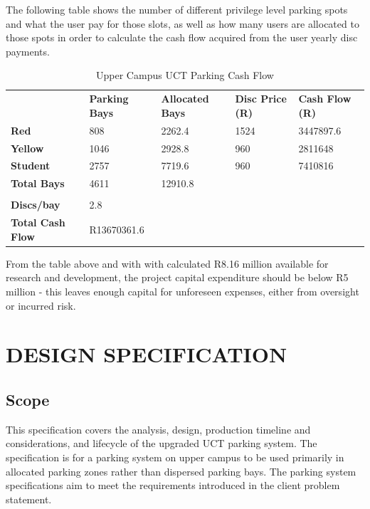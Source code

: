 The following table shows the number of different privilege level parking spots  and what the user pay for those slots, as well as how many users are allocated to those spots in order to calculate the cash flow acquired from the user yearly disc payments.

\begin{table}[H]
\centering
\caption{Upper Campus UCT Parking Cash Flow}
\label{cash-flow}
\begin{tabular}{lllll}
                         & \textbf{Parking Bays} & \textbf{Allocated Bays} & \textbf{Disc Price (R)} & \textbf{Cash Flow (R)} \\
\textbf{Red}                      & 808                   & 2262.4                  & 1524                & 3447897.6          \\
\textbf{Yellow}          & 1046                  & 2928.8                  & 960                 & 2811648            \\
\textbf{Student}         & 2757                  & 7719.6                  & 960                 & 7410816            \\
\textbf{Total Bays}      & 4611                  & 12910.8                 &                     &                    \\
\textbf{}                &                       &                         &                     &                    \\
\textbf{Discs/bay}       & 2.8                   &                         &                     &                    \\
\textbf{Total Cash Flow} & R13670361.6            &                         &                     &                   
\end{tabular}
\end{table}

From the table above and with with calculated R8.16 million available for research and development, the project capital expenditure should be below R5 million - this leaves enough capital for unforeseen expenses, either from oversight or incurred risk.

\newpage
\section{DESIGN SPECIFICATION}
\subsection{Scope}
This specification covers the analysis, design, production timeline and considerations, and lifecycle of the upgraded UCT parking system. The specification is for a parking system on upper campus to be used primarily in allocated parking zones rather than dispersed parking bays. The parking system specifications aim to meet the requirements introduced in the client problem statement.

